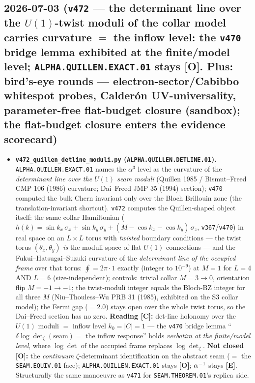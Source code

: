 \documentclass[11pt]{article}
\providecommand{\mE}{\textbf{[E]}}\providecommand{\mC}{\textbf{[C]}}
\providecommand{\mO}{\textbf{[O]}}\providecommand{\mX}{\textbf{[X]}}
\begin{document}
\subsection*{2026-07-03 (\texttt{v472} --- the determinant line over the $U(1)$-twist moduli of the collar model carries curvature $=$ the inflow level: the \texttt{v470} bridge lemma exhibited at the finite/model level; \texttt{ALPHA.QUILLEN.EXACT.01} stays \mO. Plus: bird's-eye rounds --- electron-sector/Cabibbo whitespot probes, Calder\'on UV-universality, parameter-free flat-budget closure (sandbox); the flat-budget closure enters the evidence scorecard)}
\begin{itemize}[leftmargin=1.5em]
\item \textbf{\texttt{v472\_quillen\_detline\_moduli.py} (\texttt{ALPHA.QUILLEN.DETLINE.01}).}
\texttt{ALPHA.QUILLEN.EXACT.01} names the $\alpha^3$ level as the curvature of the \emph{determinant line
over the $U(1)$ seam moduli} (Quillen 1985 / Bismut--Freed CMP 106 (1986) curvature; Dai--Freed JMP 35
(1994) section); \texttt{v470} computed the bulk Chern invariant only over the Bloch Brillouin zone (the
translation-invariant shortcut). \texttt{v472} computes the Quillen-shaped object itself: the same collar
Hamiltonian ($h(k)=\sin k_x\,\sigma_x+\sin k_y\,\sigma_y+(M-\cos k_x-\cos k_y)\,\sigma_z$,
\texttt{v367}/\texttt{v470}) in real space on an $L\times L$ torus with \emph{twisted} boundary conditions --- the twist
torus $(\theta_x,\theta_y)$ \emph{is} the moduli space of flat $U(1)$ connections --- and the
Fukui--Hatsugai--Suzuki curvature of the \emph{determinant line of the occupied frame} over that torus:
$\oint = 2\pi\cdot 1$ exactly (integer to $10^{-9}$) at $M{=}1$ for $L{=}4$ AND $L{=}6$ (size-independent);
controls: trivial collar $M{=}3\to 0$, orientation flip $M{=}{-}1\to-1$; the twist-moduli integer equals
the Bloch-BZ integer for all three $M$ (Niu--Thouless--Wu PRB 31 (1985), exhibited on the S3 collar model);
the Fermi gap ($=2.0$) stays open over the whole twist torus, so the Dai--Freed section has no zero.
\textbf{Reading \mC:} det-line holonomy over the $U(1)$ moduli $=$ inflow level $k_0=|C|=1$ --- the
\texttt{v470} bridge lemma ``$\delta\log\det_\zeta(\mathrm{seam})=$ the inflow response'' holds
\emph{verbatim at the finite/model level}, where $\log\det$ of the occupied frame replaces
$\log\det_\zeta$. \textbf{Not closed \mO:} the \emph{continuum} $\zeta$-determinant identification on the
abstract seam ($=$ the \texttt{SEAM.EQUIV.01} face); \texttt{ALPHA.QUILLEN.EXACT.01} stays \mO; $\alpha^{-1}$
stays \mE. Structurally the same manoeuvre as \texttt{v471} for \texttt{SEAM.THEOREM.01}'s replica side.

\end{itemize}
\end{document}
